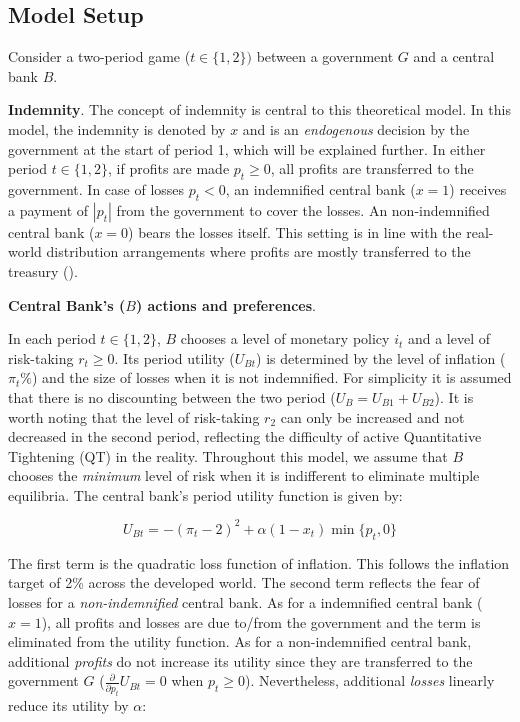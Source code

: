 \documentclass[
  a4paper,
  abstract=true]{scrartcl}
\theoremstyle{definition}
\begin{document}
\subsection{Model Setup}\label{model-setup}

Consider a two-period game (\(t\in\{1,2\})\) between a government \(G\)
and a central bank \(B\).

\textbf{Indemnity}. The concept of indemnity is central to this
theoretical model. In this model, the indemnity is denoted by \(x\) and
is an \emph{endogenous} decision by the government at the start of
period 1, which will be explained further. In either period
\(t\in\{1,2\}\), if profits are made \(p_t\geq0\), all profits are
transferred to the government. In case of losses \(p_t<0\), an
indemnified central bank (\(x=1\)) receives a payment of \(|p_t|\) from
the government to cover the losses. An non-indemnified central bank
(\(x=0\)) bears the losses itself. This setting is in line with the
real-world distribution arrangements where profits are mostly
transferred to the treasury ().

\textbf{Central Bank's (}\(B\)\textbf{) actions and preferences}.

In each period \(t\in\{1,2\}\), \(B\) chooses a level of monetary policy
\(i_t\) and a level of risk-taking \(r_t\geq0\). Its period utility
(\(U_{Bt}\)) is determined by the level of inflation (\(\pi_t\%\)) and
the size of losses when it is not indemnified. For simplicity it is
assumed that there is no discounting between the two period
(\(U_B=U_{B1}+U_{B2}\)). It is worth noting that the level of
risk-taking \(r_2\) can only be increased and not decreased in the
second period, reflecting the difficulty of active Quantitative
Tightening (QT) in the reality. Throughout this model, we assume that
\(B\) chooses the \emph{minimum} level of risk when it is indifferent to
eliminate multiple equilibria. The central bank's period utility
function is given by:

\[
U_{Bt} = -(\pi_t-2)^2 + \alpha(1-x_t)\min\{p_t,0\}
\]

The first term is the quadratic loss function of inflation. This follows
the inflation target of 2\% across the developed world. The second term
reflects the fear of losses for a \emph{non-indemnified} central bank.
As for a indemnified central bank (\(x=1\)), all profits and losses are
due to/from the government and the term is eliminated from the utility
function. As for a non-indemnified central bank, additional
\emph{profits} do not increase its utility since they are transferred to
the government \(G\) (\(\frac{\partial}{\partial p_t}U_{Bt}=0\) when
\(p_t\geq0\)). Nevertheless, additional \emph{losses} linearly reduce
its utility by \(\alpha\):
\end{document}
